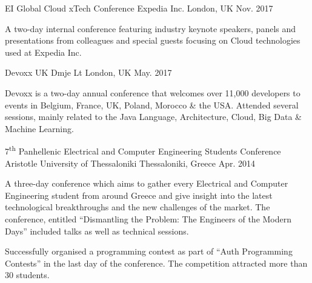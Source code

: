 

\begin{cventries}

   \cventry
    {EI Global Cloud xTech Conference} %
    {Expedia Inc.} %
    {London, UK} %
    {Nov. 2017} %
    {
      \begin{cvitems} %
        \item {A two-day internal conference featuring industry keynote speakers, panels and presentations from colleagues and special guests focusing on Cloud technologies used at Expedia Inc.}
      \end{cvitems}
    }

  \cventry
    {Devoxx UK} %
    {Dmje Lt} %
    {London, UK} %
    {May. 2017} %
    {
      \begin{cvitems} %
        \item {Devoxx is a two-day annual conference that welcomes over 11,000 developers to events in Belgium, France, UK, Poland, Morocco \& the USA. Attended several sessions, mainly related to the Java Language, Architecture,  Cloud, Big Data \& Machine Learning.}
      \end{cvitems}
    }

  \cventry
    {7\textsuperscript{th} Panhellenic Electrical and Computer Engineering Students Conference} %
    {Aristotle University of Thessaloniki} %
    {Thessaloniki, Greece} %
    {Apr. 2014} %
    {
      \begin{cvitems} %
        \item {A three-day conference which aims to gather every Electrical and Computer Engineering student from around Greece and give insight into the latest technological breakthroughs and the new challenges of the market. The conference, entitled ``Dismantling the Problem: The Engineers of the Modern Days'' included talks as well as technical sessions.}
        \item {Successfully organised a programming contest as part of ``Auth Programming Contests'' in the last day of the conference. The competition attracted more than 30 students.}
      \end{cvitems}
    }

\end{cventries}
